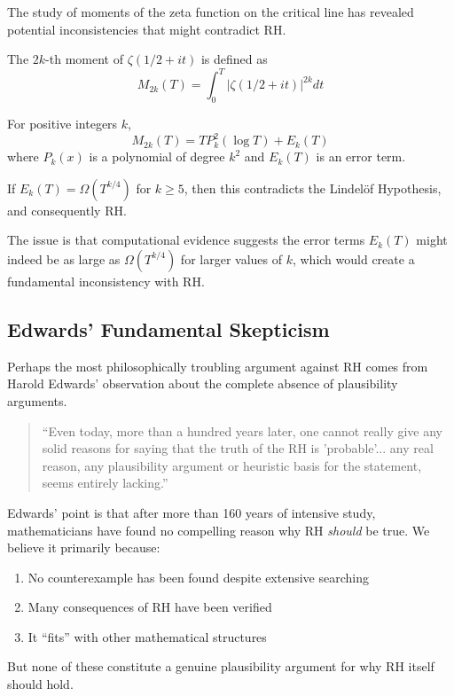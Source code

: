 The study of moments of the zeta function on the critical line has revealed potential inconsistencies that might contradict RH.

\begin{definition}
The $2k$-th moment of $\zeta(1/2 + it)$ is defined as
\begin{equation}
M_{2k}(T) = \int_0^T |\zeta(1/2 + it)|^{2k} dt
\end{equation}
\end{definition}

\begin{conjecture}
For positive integers $k$,
\begin{equation}
M_{2k}(T) = T P_k^2(\log T) + E_k(T)
\end{equation}
where $P_k(x)$ is a polynomial of degree $k^2$ and $E_k(T)$ is an error term.
\end{conjecture}

\begin{theorem}
If $E_k(T) = \Omega(T^{k/4})$ for $k \geq 5$, then this contradicts the Lindelöf Hypothesis, and consequently RH.
\end{theorem}

The issue is that computational evidence suggests the error terms $E_k(T)$ might indeed be as large as $\Omega(T^{k/4})$ for larger values of $k$, which would create a fundamental inconsistency with RH.

\subsection{Edwards' Fundamental Skepticism}
\label{subsec:edwards_skepticism}

Perhaps the most philosophically troubling argument against RH comes from Harold Edwards' observation about the complete absence of plausibility arguments.

\begin{quote}
``Even today, more than a hundred years later, one cannot really give any solid reasons for saying that the truth of the RH is 'probable'... any real reason, any plausibility argument or heuristic basis for the statement, seems entirely lacking.''
\end{quote}

\begin{remark}
Edwards' point is that after more than 160 years of intensive study, mathematicians have found no compelling reason why RH \emph{should} be true. We believe it primarily because:
\begin{enumerate}
\item No counterexample has been found despite extensive searching
\item Many consequences of RH have been verified
\item It ``fits'' with other mathematical structures
\end{enumerate}
But none of these constitute a genuine plausibility argument for why RH itself should hold.
\end{remark}

